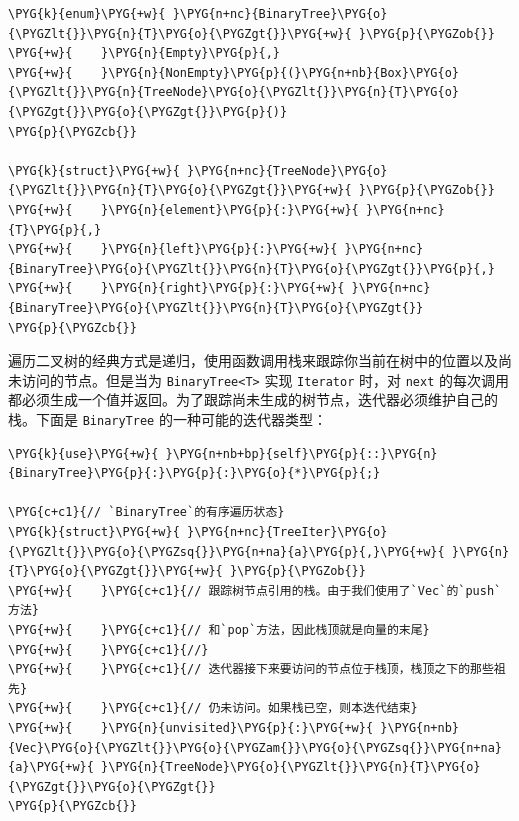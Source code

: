 \begin{Verbatim}[commandchars=\\\{\},breaklines=true,breakanywhere=true,fontsize=\codefont,xleftmargin=17bp]
\PYG{k}{enum}\PYG{+w}{ }\PYG{n+nc}{BinaryTree}\PYG{o}{\PYGZlt{}}\PYG{n}{T}\PYG{o}{\PYGZgt{}}\PYG{+w}{ }\PYG{p}{\PYGZob{}}
\PYG{+w}{    }\PYG{n}{Empty}\PYG{p}{,}
\PYG{+w}{    }\PYG{n}{NonEmpty}\PYG{p}{(}\PYG{n+nb}{Box}\PYG{o}{\PYGZlt{}}\PYG{n}{TreeNode}\PYG{o}{\PYGZlt{}}\PYG{n}{T}\PYG{o}{\PYGZgt{}}\PYG{o}{\PYGZgt{}}\PYG{p}{)}
\PYG{p}{\PYGZcb{}}

\PYG{k}{struct}\PYG{+w}{ }\PYG{n+nc}{TreeNode}\PYG{o}{\PYGZlt{}}\PYG{n}{T}\PYG{o}{\PYGZgt{}}\PYG{+w}{ }\PYG{p}{\PYGZob{}}
\PYG{+w}{    }\PYG{n}{element}\PYG{p}{:}\PYG{+w}{ }\PYG{n+nc}{T}\PYG{p}{,}
\PYG{+w}{    }\PYG{n}{left}\PYG{p}{:}\PYG{+w}{ }\PYG{n+nc}{BinaryTree}\PYG{o}{\PYGZlt{}}\PYG{n}{T}\PYG{o}{\PYGZgt{}}\PYG{p}{,}
\PYG{+w}{    }\PYG{n}{right}\PYG{p}{:}\PYG{+w}{ }\PYG{n+nc}{BinaryTree}\PYG{o}{\PYGZlt{}}\PYG{n}{T}\PYG{o}{\PYGZgt{}}
\PYG{p}{\PYGZcb{}}
\end{Verbatim}

遍历二叉树的经典方式是递归，使用函数调用栈来跟踪你当前在树中的位置以及尚未访问的节点。但是当为 \texttt{BinaryTree<T>} 实现 \texttt{Iterator} 时，对 \texttt{next} 的每次调用都必须生成一个值并返回。为了跟踪尚未生成的树节点，迭代器必须维护自己的栈。下面是 \texttt{BinaryTree} 的一种可能的迭代器类型：

\begin{Verbatim}[commandchars=\\\{\},breaklines=true,breakanywhere=true,fontsize=\codefont,xleftmargin=17bp]
\PYG{k}{use}\PYG{+w}{ }\PYG{n+nb+bp}{self}\PYG{p}{::}\PYG{n}{BinaryTree}\PYG{p}{:}\PYG{p}{:}\PYG{o}{*}\PYG{p}{;}

\PYG{c+c1}{// `BinaryTree`的有序遍历状态}
\PYG{k}{struct}\PYG{+w}{ }\PYG{n+nc}{TreeIter}\PYG{o}{\PYGZlt{}}\PYG{o}{\PYGZsq{}}\PYG{n+na}{a}\PYG{p}{,}\PYG{+w}{ }\PYG{n}{T}\PYG{o}{\PYGZgt{}}\PYG{+w}{ }\PYG{p}{\PYGZob{}}
\PYG{+w}{    }\PYG{c+c1}{// 跟踪树节点引用的栈。由于我们使用了`Vec`的`push`方法}
\PYG{+w}{    }\PYG{c+c1}{// 和`pop`方法，因此栈顶就是向量的末尾}
\PYG{+w}{    }\PYG{c+c1}{//}
\PYG{+w}{    }\PYG{c+c1}{// 迭代器接下来要访问的节点位于栈顶，栈顶之下的那些祖先}
\PYG{+w}{    }\PYG{c+c1}{// 仍未访问。如果栈已空，则本迭代结束}
\PYG{+w}{    }\PYG{n}{unvisited}\PYG{p}{:}\PYG{+w}{ }\PYG{n+nb}{Vec}\PYG{o}{\PYGZlt{}}\PYG{o}{\PYGZam{}}\PYG{o}{\PYGZsq{}}\PYG{n+na}{a}\PYG{+w}{ }\PYG{n}{TreeNode}\PYG{o}{\PYGZlt{}}\PYG{n}{T}\PYG{o}{\PYGZgt{}}\PYG{o}{\PYGZgt{}}
\PYG{p}{\PYGZcb{}}
\end{Verbatim}

